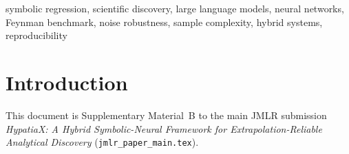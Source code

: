 \documentclass[twoside,11pt]{article}
\begin{document}
\begin{keywords}
symbolic regression, scientific discovery, large language models,
neural networks, Feynman benchmark, noise robustness, sample complexity,
hybrid systems, reproducibility
\end{keywords}

\section{Introduction}
\label{suppb:intro}

This document is Supplementary Material~B to the main JMLR submission
\emph{HypatiaX: A Hybrid Symbolic-Neural Framework for Extrapolation-Reliable
Analytical Discovery} (\texttt{jmlr\_paper\_main.tex}).
\end{document}
